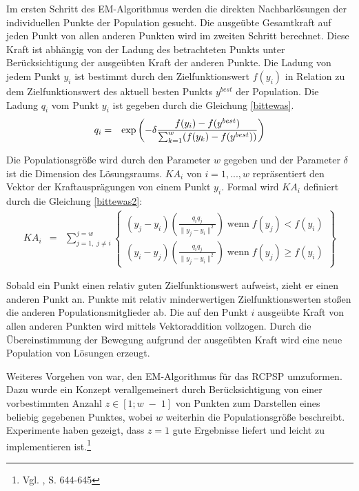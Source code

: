 \documentclass[a4paper,12pt,normalheadings,footexclude,headinclude,liststotoc,nochapterprefix,onecolumn,oneside,parskip,pointlessnumbers]{scrreprt}
\begin{document}
Im ersten Schritt des EM-Algorithmus werden die direkten Nachbarlösungen der individuellen Punkte der Population gesucht. Die ausgeübte Gesamtkraft auf jeden Punkt von allen anderen Punkten wird im zweiten Schritt berechnet. Diese Kraft ist abhängig von der Ladung des betrachteten Punkts unter Berücksichtigung der ausgeübten Kraft der anderen Punkte. Die Ladung von jedem Punkt $y_{i}$ ist bestimmt durch den Zielfunktionswert $f(y_{i})$ in Relation zu dem Zielfunktionswert des aktuell besten Punkts $y^{best}$ der Population. Die Ladung $q_{i}$ vom Punkt $y_{i}$ ist gegeben durch die Gleichung \eqref{bittewas}.
\begin{eqnarray} \label{bittewas}
q_{i} & = & \exp \left( -\delta\frac{f(y_{i})-f(y^{best})}{\sum_{k=1}^{w} (f(y_{k})-f(y^{best}))} \right) \hfill 
\end{eqnarray}

Die Populationsgröße wird durch den Parameter $w$ gegeben und der Parameter $\delta$ ist die Dimension des Lösungsraums. $KA_{i}$ von $i=1,...,w$ repräsentiert den Vektor der Kraftausprägungen von einem Punkt $y_{i}$. Formal wird $KA_{i}$ definiert durch die Gleichung \eqref{bittewas2}:
\begin{eqnarray} \label{bittewas2}
KA_{i} & = & \sum^{j=w}_{j=1,\; j\neq i} \left\{ \begin{array}{c} (y_{j}-y_{i})(\frac{q_{i}q_{j}}{\| y_{j}-y_{i}\|^{2}}) \; \text{wenn} \; f(y_{j})<f(y_{i})\\ (y_{i}-y_{j})(\frac{q_{i}q_{j}}{\| y_{j}-y_{i}\|^{2}}) \; \text{wenn} \; f(y_{j})\geq f(y_{i}) \end{array} \right\}
\end{eqnarray}

Sobald ein Punkt einen relativ guten Zielfunktionswert aufweist, zieht er einen anderen Punkt an. Punkte mit relativ minderwertigen Zielfunktionswerten stoßen die anderen Populationsmitglieder ab. Die auf den Punkt $i$ ausgeübte Kraft von allen anderen Punkten wird mittels Vektoraddition vollzogen. Durch die Übereinstimmung der Bewegung aufgrund der ausgeübten Kraft wird eine neue Population von Lösungen erzeugt.

Weiteres Vorgehen von \cite{debels2006hybrid} war, den EM-Algorith\-mus für das RCPSP umzuformen. Dazu wurde ein Konzept verallgemeinert durch Berücksichtigung von einer vorbestimmten Anzahl $z \in [1; w\; - \; 1]$ von Punkten zum Darstellen eines beliebig gegebenen Punktes, wobei $w$ weiterhin die Populationsgröße beschreibt. Experimente haben gezeigt, dass $z=1$ gute Ergebnisse liefert und leicht zu implementieren ist.\footnote{Vgl. \cite{debels2006hybrid}, S. 644-645\label{debels}}
\end{document}
